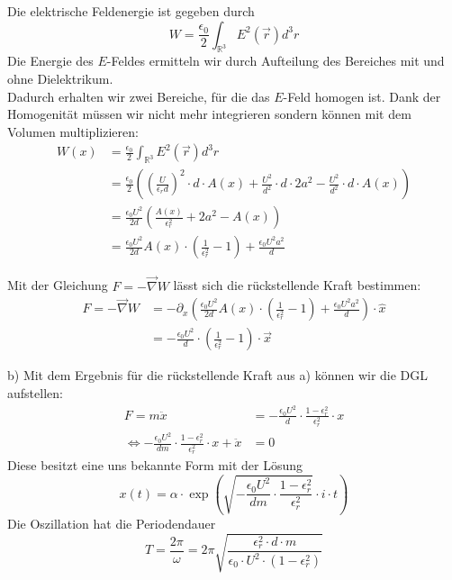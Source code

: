 \documentclass[11pt a4paper]{article}
\newcommand{\epsz}{\epsilon_0}
\begin{document}
Die elektrische Feldenergie ist gegeben durch
\[
	W = \frac{\epsz}{2} \int_{\mathbb{R}^3} E^2(\vec r) d^3r 
\]
Die Energie des $E$-Feldes ermitteln wir durch Aufteilung des Bereiches
mit und ohne Dielektrikum.\\
Dadurch erhalten wir zwei Bereiche, für die das $E$-Feld homogen ist. Dank
der Homogenität müssen wir nicht mehr integrieren sondern können mit dem 
Volumen multiplizieren:
\begin{align*}
	W(x) &= \frac{\epsz}{2} \int_{\mathbb{R}^3} E^2(\vec r) d^3r \\
	&= \frac{\epsz}{2} \left(
		\left(\frac{U}{\epsilon_r d}\right)^2 \cdot d \cdot A(x) +
		\frac{U^2}{d^2} \cdot d \cdot 2a^2 -
		\frac{U^2}{d^2} \cdot d \cdot A(x) \right) \\
	&= \frac{\epsz U^2}{2d} 
	\left( \frac{A(x)}{\epsilon_r^2} + 2a^2 - A(x) \right)\\
	&= \frac{\epsz U^2}{2d} A(x) 
	\cdot \left(\frac{1}{\epsilon_r^2} -1\right) +
	\frac{\epsz U^2 a^2}{d}
\end{align*}

\newpage
\setlength{\headheight}{0cm}

Mit der Gleichung $F = -\vec\nabla W$ lässt sich die rückstellende Kraft
bestimmen:
\begin{align*}
	F = -\vec\nabla W &= -\partial_x \left(
	\frac{\epsz U^2}{2d} A(x) 
	\cdot \left(\frac{1}{\epsilon_r^2} -1\right) +
	\frac{\epsz U^2 a^2}{d} 
	\right) \cdot \hat x\\
	&= -\frac{\epsz U^2}{d} \cdot \left(\frac{1}{\epsilon_r^2} -1
	\right) \cdot \vec x
\end{align*}

b) Mit dem Ergebnis für die rückstellende Kraft aus a) können wir die DGL 
aufstellen:
\begin{align*}
	F = m\ddot x
	&= -\frac{\epsz U^2}{d} \cdot \frac{1 - \epsilon_r^2}{\epsilon_r^2}
	\cdot x \\
	\Leftrightarrow
	-\frac{\epsz U^2}{dm} \cdot \frac{1 - \epsilon_r^2}{\epsilon_r^2}
	\cdot x + \ddot x &= 0
\end{align*}
Diese besitzt eine uns bekannte Form mit der Lösung
\[
	x(t) = \alpha \cdot \exp\left(
	\sqrt{-\frac{\epsz U^2}{dm} \cdot \frac{1 - \epsilon_r^2}
	{\epsilon_r^2}}  \cdot i \cdot t \right)
\]
Die Oszillation hat die Periodendauer
\[
	T = \frac{2\pi}{\omega} = 2\pi \sqrt{\frac
	{\epsilon_r^2 \cdot d \cdot m}
	{\epsz \cdot U^2 \cdot (1 - \epsilon_r^2)}}
\]
\end{document}
